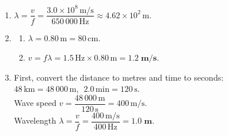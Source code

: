 \documentclass[12pt]{article}
\begin{document}
\begin{enumerate}
    \item[\textbf{11.}] \(\lambda = \dfrac{v}{f} = \dfrac{3.0\times10^{8}\,\text{m/s}}{650\,000\,\text{Hz}} \approx 4.62\times10^{2}\,\text{m}\).

    \item[\textbf{12.}] 
        \begin{enumerate}
            \item \(\lambda = 0.80\,\text{m} = 80\,\text{cm}\).
            \item \(v = f\lambda = 1.5\,\text{Hz} \times 0.80\,\text{m} = \mathbf{1.2\;m/s}\).
        \end{enumerate}

    \item[\textbf{13.}] First, convert the distance to metres and time to seconds:\\
        \(48\,\text{km} = 48\,000\,\text{m}\), \(\;2.0\,\text{min} = 120\,\text{s}\).\\
        Wave speed \(v = \dfrac{48\,000\,\text{m}}{120\,\text{s}} = 400\,\text{m/s}\).\\
        Wavelength \( \lambda = \dfrac{v}{f} = \dfrac{400\,\text{m/s}}{400\,\text{Hz}} = \mathbf{1.0\;m}\).
\end{enumerate}
\end{document}
